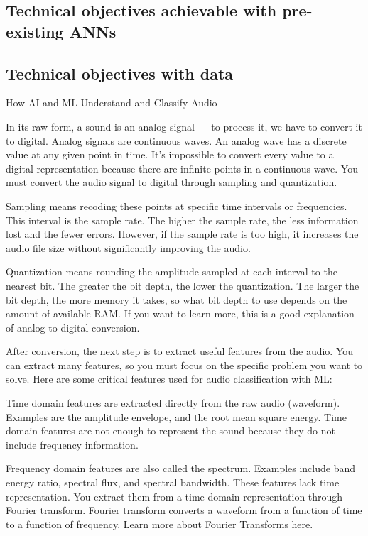 \documentclass[11pt]{article}
\begin{document}
\subsection{Technical objectives achievable with pre-existing ANNs}




\subsection{Technical objectives with data}
{\color{blue}
  How AI and ML Understand and Classify Audio

  In its raw form, a sound is an analog signal — to process it, we have to convert it to digital. Analog signals are continuous waves. An analog wave has a discrete value at any given point in time. It’s impossible to convert every value to a digital representation because there are infinite points in a continuous wave. You must convert the audio signal to digital through sampling and quantization.

  Sampling means recoding these points at specific time intervals or frequencies. This interval is the sample rate. The higher the sample rate, the less information lost and the fewer errors. However, if the sample rate is too high, it increases the audio file size without significantly improving the audio.

  Quantization means rounding the amplitude sampled at each interval to the nearest bit. The greater the bit depth, the lower the quantization. The larger the bit depth, the more memory it takes, so what bit depth to use depends on the amount of available RAM. If you want to learn more, this is a good explanation of analog to digital conversion.

  After conversion, the next step is to extract useful features from the audio. You can extract many features, so you must focus on the specific problem you want to solve. Here are some critical features used for audio classification with ML:

  Time domain features are extracted directly from the raw audio (waveform). Examples are the amplitude envelope, and the root mean square energy. Time domain features are not enough to represent the sound because they do not include frequency information.

  Frequency domain features are also called the spectrum. Examples include band energy ratio, spectral flux, and spectral bandwidth. These features lack time representation. You extract them from a time domain representation through Fourier transform. Fourier transform converts a waveform from a function of time to a function of frequency. Learn more about Fourier Transforms here.

}
\end{document}
